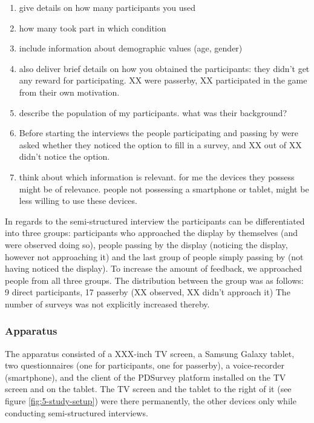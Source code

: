 		\begin{enumerate}
		\item give details on how many participants you used
		\item how many took part in which condition
		\item include information about demographic values (age, gender)
		\item also deliver brief details on how you obtained the participants: they didn't get any reward for participating. XX were passerby, XX participated in the game from their own motivation.
		\item describe the population of my participants. what was their background?
		\item  Before starting the interviews the people participating and passing by were asked whether they noticed the option to fill in a survey, and XX out of XX didn't notice the option. 
		\item think about which information is relevant. for me the devices they possess might be of relevance. people not possessing a smartphone or tablet, might be less willing to use these devices.  
		\end{enumerate}



		In regards to the semi-structured interview the participants can be differentiated into three groups: participants who approached the display by themselves (and were observed doing so), people passing by the display (noticing the display, however not approaching it) and the last group of people simply passing by (not having noticed the display). To increase the amount of feedback, we approached people from all three groups. The distribution between the group was as follows: 9 direct participants, 17 passerby (XX observed, XX didn't approach it)
		The number of surveys was not explicitly increased thereby.




	\subsubsection{Apparatus}

		The apparatus consisted of a XXX-inch TV screen, a Samsung Galaxy tablet, two questionnaires (one for participants, one for passerby), a voice-recorder (smartphone), and the client of the PDSurvey platform installed on the TV screen and on the tablet. The TV screen and the tablet to the right of it (see figure \ref{fig:5-study-setup}) were there permanently, the other devices only while conducting semi-structured interviews.



